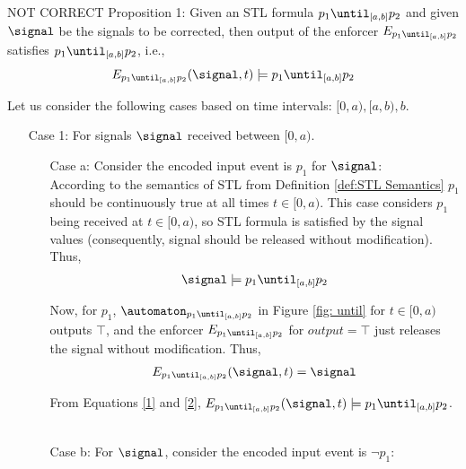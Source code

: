 NOT CORRECT
\color{red}
    Proposition 1: Given an STL formula $p_1\until_{[a,b]}p_2$ and given $\signal$ be the signals to be corrected, then output of the enforcer $E_{p_1\until_{[a,b]}p_2}$ satisfies $p_1\until_{[a,b]}p_2$, i.e., 
        \begin{align*}
            E_{p_1\until_{[a,b]}p_2}(\signal, t) \models p_1\until_{[a,b]}p_2
        \end{align*}

  
Let us consider the following cases based on time intervals: $[0, a), [a,b), b$.
\begin{enumerate}
        \item [Case 1:] For signals $\signal$ received between $[0, a)$.\\
        \begin{enumerate}
            \item [Case a:] Consider the encoded input event is $p_1$ for $\signal$:\\
            
            According to the semantics of STL from Definition \ref{def:STL Semantics} $p_1$ should be continuously true at all times $t \in [0, a)$. This case considers $p_1$ being received at $t \in [0, a)$, so STL formula is satisfied by the signal values (consequently, signal should be released without modification). Thus, 
            \begin{align}
            \label{1}
                \signal \models p_1\until_{[a,b]}p_2
            \end{align}

            Now, for $p_1$, $\automaton_{p_1\until_{[a,b]}p_2}$ in Figure \ref{fig: until} for $t \in [0, a)$ outputs $\top$, and the enforcer $E_{p_1\until_{[a,b]}p_2}$ for $output=\top$ just releases the signal without modification. Thus,
            \begin{align}
            \label{2}
                E_{p_1\until_{[a,b]}p_2}(\signal, t)=\signal
            \end{align}

            From Equations \ref{1} and \ref{2},  $E_{p_1\until_{[a,b]}p_2}(\signal, t) \models p_1\until_{[a,b]}p_2$. \\~\\

            
            \item [Case b:] For $\signal$, consider the encoded input event is $\neg p_1$:\\
            

\end{enumerate}
\end{enumerate}
